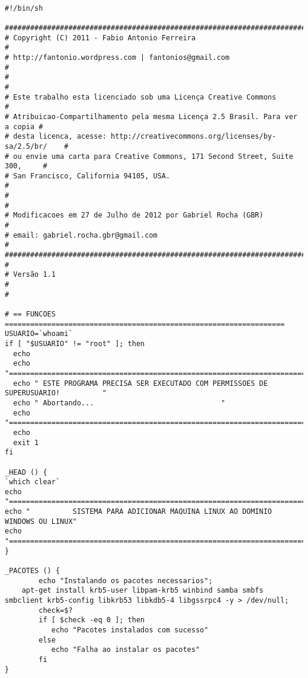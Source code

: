 
\begin{lstlisting}

#!/bin/sh
 
###############################################################################
# Copyright (C) 2011 - Fabio Antonio Ferreira                                 #
# http://fantonio.wordpress.com | fantonios@gmail.com                         #
#                                                                             #
# Este trabalho esta licenciado sob uma Licença Creative Commons              #
# Atribuicao-Compartilhamento pela mesma Licença 2.5 Brasil. Para ver a copia #
# desta licenca, acesse: http://creativecommons.org/licenses/by-sa/2.5/br/    #
# ou envie uma carta para Creative Commons, 171 Second Street, Suite 300,     #
# San Francisco, California 94105, USA.                                       #
#                                                                             #
# Modificacoes em 27 de Julho de 2012 por Gabriel Rocha (GBR)                 #
# email: gabriel.rocha.gbr@gmail.com                                          #
###############################################################################
#
# Versão 1.1
#
#
 
# == FUNCOES ==================================================================
USUARIO=`whoami`
if [ "$USUARIO" != "root" ]; then
  echo
  echo "=============================================================================="
  echo " ESTE PROGRAMA PRECISA SER EXECUTADO COM PERMISSOES DE SUPERUSUARIO!          "  
  echo " Abortando...                              "
  echo "=============================================================================="
  echo
  exit 1
fi
 
_HEAD () {
`which clear`
echo "=============================================================================="
echo "          SISTEMA PARA ADICIONAR MAQUINA LINUX AO DOMINIO WINDOWS OU LINUX"
echo "=============================================================================="
}
 
_PACOTES () {
        echo "Instalando os pacotes necessarios";       
	apt-get install krb5-user libpam-krb5 winbind samba smbfs smbclient krb5-config libkrb53 libkdb5-4 libgssrpc4 -y > /dev/null;
        check=$?
        if [ $check -eq 0 ]; then
           echo "Pacotes instalados com sucesso"
        else
           echo "Falha ao instalar os pacotes"
        fi
}
 

\end{lstlisting}
